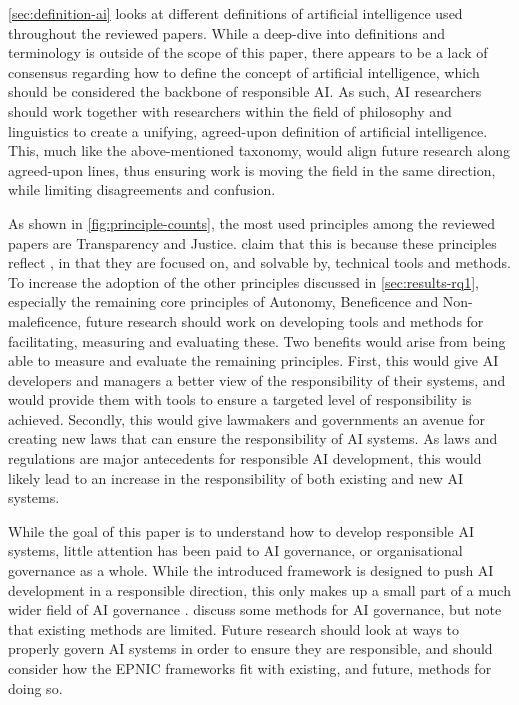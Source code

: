\autoref{sec:definition-ai} looks at different definitions of artificial intelligence used throughout the reviewed papers. While a deep-dive into definitions and terminology is outside of the scope of this paper, there appears to be a lack of consensus regarding how to define the concept of artificial intelligence, which should be considered the backbone of responsible AI. As such, AI researchers should work together with researchers within the field of philosophy and linguistics to create a unifying, agreed-upon definition of artificial intelligence. This, much like the above-mentioned taxonomy, would align future research along agreed-upon lines, thus ensuring work is moving the field in the same direction, while limiting disagreements and confusion.


As shown in \autoref{fig:principle-counts}, the most used principles among the reviewed papers are Transparency and Justice. \textcite[p.~103]{Hagendorff_2020} claim that this is because these principles reflect , in that they are focused on, and solvable by, technical tools and methods. To increase the adoption of the other principles discussed in \autoref{sec:results-rq1}, especially the remaining core principles of Autonomy, Beneficence and Non-maleficence, future research should work on developing tools and methods for facilitating, measuring and evaluating these. Two benefits would arise from being able to measure and evaluate the remaining principles. First, this would give AI developers and managers a better view of the responsibility of their systems, and would provide them with tools to ensure a targeted level of responsibility is achieved. Secondly, this would give lawmakers and governments an avenue for creating new laws that can ensure the responsibility of AI systems. As laws and regulations are major antecedents for responsible AI development, this would likely lead to an increase in the responsibility of both existing and new AI systems.


While the goal of this paper is to understand how to develop responsible AI systems, little attention has been paid to AI governance, or organisational governance as a whole. While the introduced framework is designed to push AI development in a responsible direction, this only makes up a small part of a much wider field of AI governance \parencite{Papagiannidis_2022_governance}. \textcite{Gianni_2022} discuss some methods for AI governance, but note that existing methods are limited. Future research should look at ways to properly govern AI systems in order to ensure they are responsible, and should consider how the EPNIC frameworks fit with existing, and future, methods for doing so.

